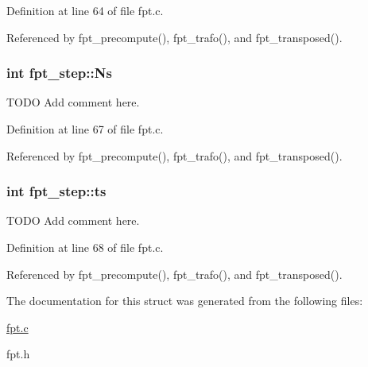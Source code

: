 Definition at line 64 of file fpt.c.

Referenced by fpt\_\-precompute(), fpt\_\-trafo(), and fpt\_\-transposed().\hypertarget{structfpt__step_d3011a98797dae243ce3ba74dbf65c54}{
\subsubsection{\setlength{\rightskip}{0pt plus 5cm}int {\bf fpt\_\-step::Ns}}}
\label{structfpt__step_d3011a98797dae243ce3ba74dbf65c54}


TODO Add comment here. 



Definition at line 67 of file fpt.c.

Referenced by fpt\_\-precompute(), fpt\_\-trafo(), and fpt\_\-transposed().\hypertarget{structfpt__step_b3999986507dba7bcdd28be976a90029}{
\subsubsection{\setlength{\rightskip}{0pt plus 5cm}int {\bf fpt\_\-step::ts}}}
\label{structfpt__step_b3999986507dba7bcdd28be976a90029}


TODO Add comment here. 



Definition at line 68 of file fpt.c.

Referenced by fpt\_\-precompute(), fpt\_\-trafo(), and fpt\_\-transposed().

The documentation for this struct was generated from the following files:\begin{CompactItemize}
\item 
\hyperlink{fpt_8c}{fpt.c}\item 
fpt.h\end{CompactItemize}
